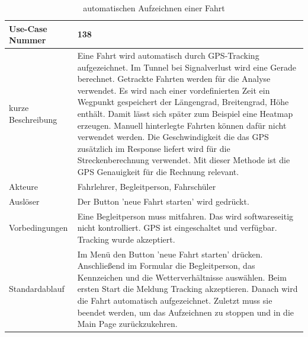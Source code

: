 \begin{table}[H]
	\centering
	\begin{tabularx}{\textwidth}{|l|X|}
		\hline
		Use-Case Nummer & 138 \\
		\hline
		kurze Beschreibung & Eine Fahrt wird automatisch durch GPS-Tracking aufgezeichnet. Im Tunnel bei Signalverlust wird eine Gerade berechnet. Getrackte Fahrten werden für die Analyse verwendet. Es wird nach einer vordefinierten Zeit ein Wegpunkt gespeichert der Längengrad, Breitengrad, Höhe enthält. Damit lässt sich später zum Beispiel eine Heatmap erzeugen. Manuell hinterlegte Fahrten können dafür nicht verwendet werden. Die Geschwindigkeit die das GPS zusätzlich im Response liefert wird für die Streckenberechnung verwendet. Mit dieser Methode ist die GPS Genauigkeit für die Rechnung relevant.    \\
		\hline
		Akteure &  Fahrlehrer, Begleitperson, Fahrschüler\\
		\hline
		Auslöser & Der Button 'neue Fahrt starten' wird gedrückt. \\
		\hline
		Vorbedingungen & Eine Begleitperson muss mitfahren. Das wird softwareseitig nicht kontrolliert. GPS ist eingeschaltet und verfügbar. Tracking wurde akzeptiert. \\
		\hline
		Standardablauf & Im Menü den Button 'neue Fahrt starten' drücken. Anschließend im Formular die Begleitperson, das Kennzeichen und die Wetterverhältnisse auswählen. Beim ersten Start die Meldung Tracking akzeptieren. Danach wird die Fahrt automatisch aufgezeichnet. Zuletzt muss sie beendet werden, um das Aufzeichnen zu stoppen und in die Main Page zurückzukehren. \\
		\hline
	\end{tabularx}
	\caption{automatischen Aufzeichnen einer Fahrt}
	\label{tab:USE-Case2}
\end{table}


